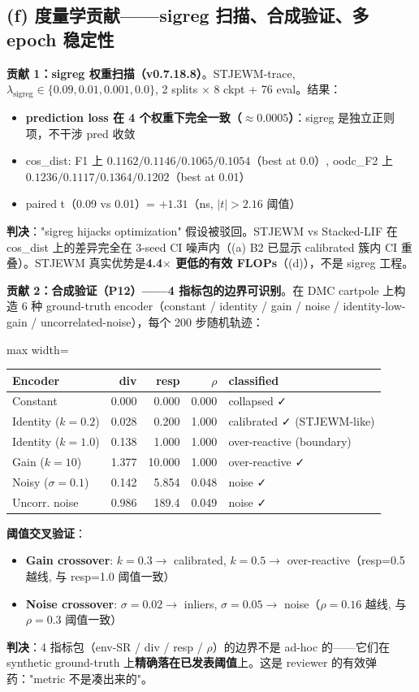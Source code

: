 \documentclass[11pt,a4paper]{article}
\begin{document}
\subsection{(f) 度量学贡献——sigreg 扫描、合成验证、多 epoch 稳定性}

\textbf{贡献 1：sigreg 权重扫描（v0.7.18.8）}。STJEWM-trace, $\lambda_{\text{sigreg}} \in \{0.09, 0.01, 0.001, 0.0\}$, 2 splits × 8 ckpt + 76 eval。结果：
\begin{itemize}[leftmargin=2em]
\item \textbf{prediction loss 在 4 个权重下完全一致（$\approx 0.0005$）}：sigreg 是独立正则项，不干涉 pred 收敛
\item cos\_dist: F1 上 $0.1162 / 0.1146 / 0.1065 / 0.1054$（best at 0.0）, oodc\_F2 上 $0.1236 / 0.1117 / 0.1364 / 0.1202$（best at 0.01）
\item paired t（0.09 vs 0.01）= $+1.31$（ns, $|t|>2.16$ 阈值）
\end{itemize}
\textbf{判决}："sigreg hijacks optimization" 假设被驳回。STJEWM vs Stacked-LIF 在 cos\_dist 上的差异完全在 3-seed CI 噪声内（(a) B2 已显示 calibrated 簇内 CI 重叠）。STJEWM 真实优势是\textbf{4.4$\times$ 更低的有效 FLOPs}（(d)），不是 sigreg 工程。

\textbf{贡献 2：合成验证（P12）——4 指标包的边界可识别}。在 DMC cartpole 上构造 6 种 ground-truth encoder（constant / identity / gain / noise / identity-low-gain / uncorrelated-noise），每个 200 步随机轨迹：
\begin{adjustbox}{max width=\textwidth}
\scriptsize
\begin{tabular}{lrrrl}
\toprule
\textbf{Encoder} & \textbf{div} & \textbf{resp} & \textbf{$\rho$} & \textbf{classified} \\
\midrule
Constant & 0.000 & 0.000 & 0.000 & collapsed ✓ \\
Identity ($k=0.2$) & 0.028 & 0.200 & 1.000 & calibrated ✓ (STJEWM-like) \\
Identity ($k=1.0$) & 0.138 & 1.000 & 1.000 & over-reactive (boundary) \\
Gain ($k=10$) & 1.377 & 10.000 & 1.000 & over-reactive ✓ \\
Noisy ($\sigma=0.1$) & 0.142 & 5.854 & 0.048 & noise ✓ \\
Uncorr. noise & 0.986 & 189.4 & 0.049 & noise ✓ \\
\bottomrule
\end{tabular}
\end{adjustbox}

\textbf{阈值交叉验证}：
\begin{itemize}[leftmargin=2em]
\item \textbf{Gain crossover}: $k=0.3 \to$ calibrated, $k=0.5 \to$ over-reactive（resp=0.5 越线, 与 resp=1.0 阈值一致）
\item \textbf{Noise crossover}: $\sigma=0.02 \to$ inliers, $\sigma=0.05 \to$ noise（$\rho=0.16$ 越线, 与 $\rho=0.3$ 阈值一致）
\end{itemize}
\textbf{判决}：4 指标包（env-SR / div / resp / $\rho$）的边界不是 ad-hoc 的——它们在 synthetic ground-truth 上\textbf{精确落在已发表阈值}上。这是 reviewer 的有效弹药："metric 不是凑出来的"。
\end{document}
